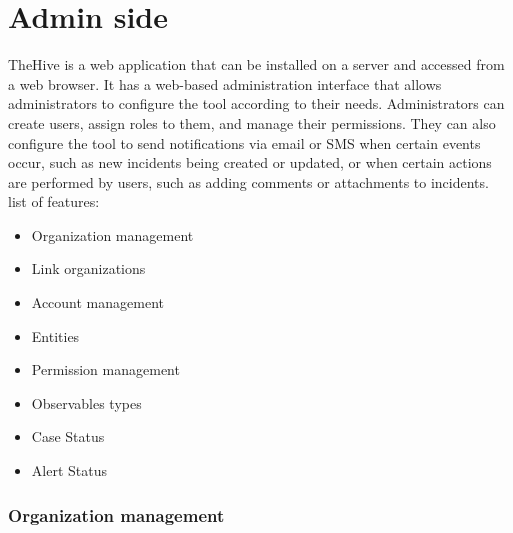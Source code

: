 \documentclass{article}
\begin{document}
\section{Admin side}
TheHive is a web application that can be installed on a server and accessed from a web browser. It has a web-based administration interface that allows administrators to configure the tool according to their needs. Administrators can create users, assign roles to them, and manage their permissions. They can also configure the tool to send notifications via email or SMS when certain events occur, such as new incidents being created or updated, or when certain actions are performed by users, such as adding comments or attachments to incidents.
list of features:
\begin{itemize}
\item Organization management
\item Link organizations
\item Account management
\item Entities 
\item Permission management
\item Observables types
\item Case Status
\item Alert Status
\end{itemize}

\subsubsection*{Organization management}
\end{document}
